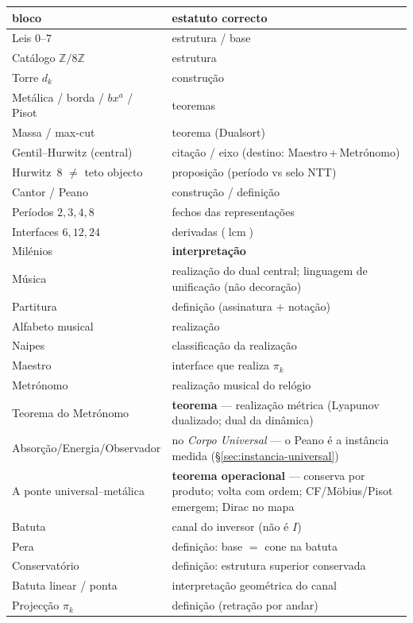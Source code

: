 \documentclass[11pt,a4paper]{article}
\begin{document}
\begin{center}\small
\begin{tabular}{@{}ll@{}}
bloco & estatuto correcto \\
\hline
Leis $0$--$7$ & estrutura / base \\
Catálogo $\mathbb{Z}/8\mathbb{Z}$ & estrutura \\
Torre $d_k$ & construção \\
Metálica / borda / $bx^{a}$ / Pisot & teoremas \\
Massa / max-cut & teorema (Dualsort) \\
Gentil--Hurwitz (central) & citação / eixo (destino: Maestro\,+\,Metrónomo) \\
Hurwitz~$8$ $\neq$ teto objecto & proposição (período vs selo NTT) \\
Cantor / Peano & construção / definição \\
Períodos $2,3,4,8$ & fechos das representações \\
Interfaces $6,12,24$ & derivadas ($\operatorname{lcm}$) \\
Milénios & \textbf{interpretação} \\
Música & realização do dual central; linguagem de unificação (não decoração) \\
Partitura & definição (assinatura $+$ notação) \\
Alfabeto musical & realização \\
Naipes & classificação da realização \\
Maestro & interface que realiza $\pi_k$ \\
Metrónomo & realização musical do relógio \\
Teorema do Metrónomo & \textbf{teorema} --- realização métrica
  (Lyapunov dualizado; dual da dinâmica) \\
Absorção/Energia/Observador & no \emph{Corpo Universal} --- o Peano
  é a instância medida (\S\ref{sec:instancia-universal}) \\
A ponte universal--metálica & \textbf{teorema operacional} --- conserva por
  produto; volta com ordem; CF/Möbius/Pisot emergem; Dirac no mapa \\
Batuta & canal do inversor (não é $I$) \\
Pera & definição: base $=$ cone na batuta \\
Conservatório & definição: estrutura superior conservada \\
Batuta linear / ponta & interpretação geométrica do canal \\
Projecção $\pi_k$ & definição (retração por andar) \\

\end{tabular}
\end{center}
\end{document}

